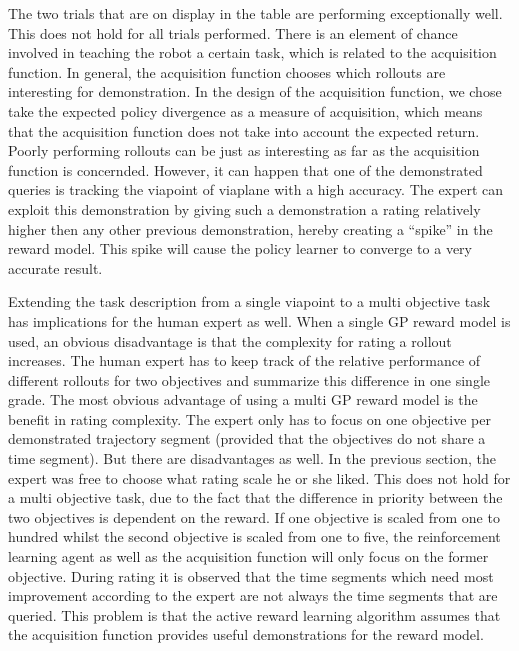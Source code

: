 \documentclass[mscThesis.tex]{subfiles}
\begin{document}
The two trials that are on display in the table are performing exceptionally well. This does not hold for all trials performed. There is an element of chance involved in teaching the robot a certain task, which is related to the acquisition function. In general, the acquisition function chooses which rollouts are interesting for demonstration. In the design of the acquisition function, we chose take the expected policy divergence as a measure of acquisition, which means that the acquisition function does not take into account the expected return. Poorly performing rollouts can be just as interesting as far as the acquisition function is concernded. However, it can happen that one of the demonstrated queries is tracking the viapoint of viaplane with a high accuracy. The expert can exploit this demonstration by giving such a demonstration a rating relatively higher then any other previous demonstration, hereby creating a ``spike'' in the reward model. This spike will cause the policy learner to converge to a very accurate result.

Extending the task description from a single viapoint to a multi objective task has implications for the human expert as well. When a single GP reward model is used, an obvious disadvantage is that the complexity for rating a rollout increases. The human expert has to keep track of the relative performance of different rollouts for two objectives and summarize this difference in one single grade. The most obvious advantage of using a multi GP reward model is the benefit in rating complexity. The expert only has to focus on one objective per demonstrated trajectory segment (provided that the objectives do not share a time segment). But there are disadvantages as well. In the previous section, the expert was free to choose what rating scale he or she liked. This does not hold for a multi objective task, due to the fact that the difference in priority between the two objectives is dependent on the reward. If one objective is scaled from one to hundred whilst the second objective is scaled from one to five, the reinforcement learning agent as well as the acquisition function will only focus on the former objective. During rating it is observed that the time segments which need most improvement according to the expert are not always the time segments that are queried. This problem is that the active reward learning algorithm assumes that the acquisition function provides useful demonstrations for the reward model. 
\end{document}
